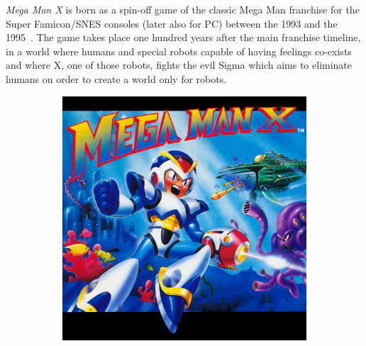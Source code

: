 
\textit{Mega Man X} is born as a spin-off game of the classic Mega Man franchise for the Super Famicon/SNES consoles (later also for PC)  between the 1993 and the 1995~\cite{wiki:MMX}. The game takes place one hundred years after the main franchise timeline, in a world where humans and special robots capable of having feelings co-exists and where X, one of those robots, fights the evil Sigma which aims to eliminate humans on order to create a world only for robots.

\begin{figure}[htp]
	\centering
	\begin{subfigure}{0.4\linewidth}
		\centering
		\includegraphics[width=\linewidth]{figures/X1/mmx_cover.jpeg}
	\end{subfigure}
	\begin{subfigure}{0.4\linewidth}
		\centering

\end{subfigure}
\end{figure}
